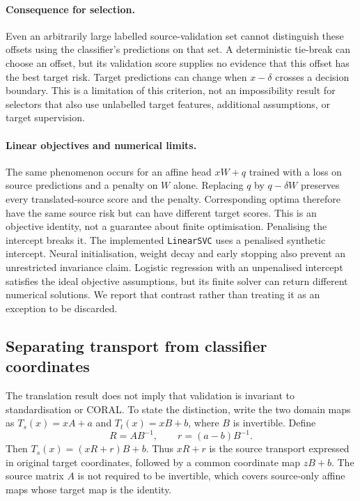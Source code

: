 \paragraph{Consequence for selection.}
Even an arbitrarily large labelled source-validation set cannot distinguish
these offsets using the classifier's predictions on that set. A deterministic
tie-break can choose an offset, but its validation score supplies no evidence
that this offset has the best target risk. Target predictions can change when
$x-\delta$ crosses a decision boundary. This is a limitation of this criterion,
not an impossibility result for selectors that also use unlabelled target
features, additional assumptions, or target supervision.

\paragraph{Linear objectives and numerical limits.}
The same phenomenon occurs for an affine head $xW+q$ trained with a loss on
source predictions and a penalty on $W$ alone. Replacing $q$ by $q-\delta W$
preserves every translated-source score and the penalty. Corresponding optima
therefore have the same source risk but can have different target scores.
This is an objective identity, not a guarantee about finite optimisation.
Penalising the intercept breaks it. The implemented \texttt{LinearSVC} uses a
penalised synthetic intercept. Neural initialisation, weight decay and early
stopping also prevent an unrestricted invariance claim. Logistic regression
with an unpenalised intercept satisfies the ideal objective assumptions, but
its finite solver can return different numerical solutions. We report that
contrast rather than treating it as an exception to be discarded.

\subsection{Separating transport from classifier coordinates}
\label{sec:affine-factorisation}

The translation result does not imply that validation is invariant to
standardisation or CORAL. To state the distinction, write the two domain maps
as $T_s(x)=xA+a$ and $T_t(x)=xB+b$, where $B$ is invertible. Define
\begin{equation}
 R=AB^{-1},\qquad r=(a-b)B^{-1}.
 \label{eq:relative-transport}
\end{equation}
Then $T_s(x)=(xR+r)B+b$. Thus $xR+r$ is the source transport expressed in
original target coordinates, followed by a common coordinate map $zB+b$.
The source matrix $A$ is not required to be invertible, which covers
source-only affine maps whose target map is the identity.


